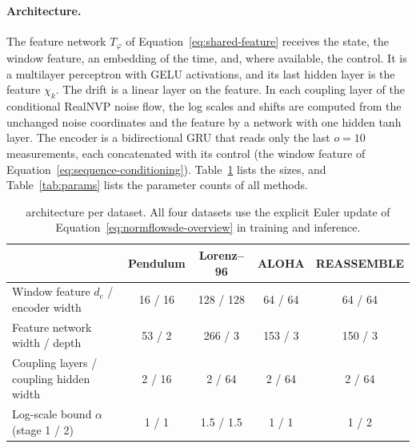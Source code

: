 \paragraph{Architecture.}
The feature network $T_\varphi$ of Equation~\eqref{eq:shared-feature} receives the state, the window feature, an embedding of the time, and, where available, the control. It is a multilayer perceptron with GELU activations, and its last hidden layer is the feature $\chi_k$. The drift is a linear layer on the feature. In each coupling layer of the conditional RealNVP noise flow, the log scales and shifts are computed from the unchanged noise coordinates and the feature by a network with one hidden tanh layer. The encoder is a bidirectional GRU that reads only the last $o=10$ measurements, each concatenated with its control (the window feature of Equation~\eqref{eq:sequence-conditioning}). Table~\ref{tab:nfsde-arch} lists the sizes, and Table~\ref{tab:params} lists the parameter counts of all methods.
\begin{table}[htbp]
\centering\footnotesize
\begin{tabular}{lcccc}
\toprule
 & Pendulum & Lorenz--96 & ALOHA & REASSEMBLE \\
\midrule
Window feature $d_c$ / encoder width & 16 / 16 & 128 / 128 & 64 / 64 & 64 / 64 \\
Feature network width / depth & 53 / 2 & 266 / 3 & 153 / 3 & 150 / 3 \\
Coupling layers / coupling hidden width & 2 / 16 & 2 / 64 & 2 / 64 & 2 / 64 \\
Log-scale bound $\alpha$ (stage 1 / 2) & 1 / 1 & 1.5 / 1.5 & 1 / 1 & 1 / 2 \\
\bottomrule
\end{tabular}
\caption{\method architecture per dataset. All four datasets use the explicit Euler update of Equation~\eqref{eq:normflowsde-overview} in training and inference.}
\label{tab:nfsde-arch}
\end{table}

